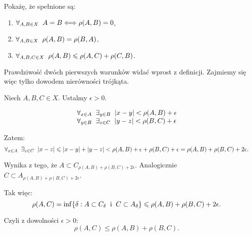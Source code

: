 \documentclass{mini}
\begin{document}
\begin{dow}

Pokażę, że spełnione są:

\begin{enumerate}
\item $\forall_{A,B \in X} \hspace{2mm} A=B \Longleftrightarrow \rho(A,B)=0 $,\\
\item $\forall_{A,B \in X} \hspace{2mm} \rho(A,B)= \rho(B,A)$,\\
\item $\forall_{A,B,C \in X} \hspace{2mm} \rho(A,B) \leqslant \rho(A,C) + \rho(C,B)$.
\end{enumerate}

Prawdziwość dwóch pierwszych warunków widać wprost z definicji. Zajmiemy się więc tylko dowodem nierówności trójkąta.  

Niech $A,B,C \in X$. Ustalmy $\epsilon >0$.

$$
\begin{array}{l}
\forall_{x \in A} \hspace{2mm} \exists_{y \in B} \hspace{2mm} |x-y|<\rho(A,B)+\epsilon\\
\forall_{y \in B} \hspace{2mm} \exists_{z \in C} \hspace{2mm} |y-z|<\rho(B,C)+\epsilon
\end{array}
$$

Zatem:
$$
\forall_{x \in A} \hspace{2mm} \exists_{z \in C} \hspace{2mm} |x-z| \leqslant |x-y|+|y-z|<\rho(A,B)+\epsilon+\rho(B,C)+\epsilon=\rho(A,B)+\rho(B,C)+2\epsilon.
$$

Wynika z tego, że $A \subset C_{\rho(A,B)+\rho(B,C)+2\epsilon}$. Analogicznie $C \subset A_{\rho(A,B)+\rho(B,C)+2\epsilon}$.

Tak więc:
$$
\rho(A,C)=\inf\lbrace\delta: A \subset C_{\delta} \hspace{2mm} \textrm{i} \hspace{2mm} C \subset A_{\delta} \rbrace \leqslant \rho(A,B)+\rho(B,C)+2\epsilon.
$$

Czyli z dowolności $\epsilon>0$:
$$
\rho(A,C) \leqslant \rho(A,B)+\rho(B,C).
$$

\end{dow}
\end{document}

